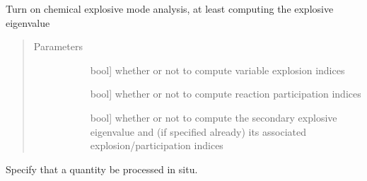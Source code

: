 \documentclass[letterpaper,10pt,english]{sphinxmanual}
\begin{document}
\begin{fulllineitems}
\begin{fulllineitems}
\begin{quote}
\begin{description}
\begin{description}
\end{description}

\end{description}\end{quote}

\end{fulllineitems}


\begin{fulllineitems}
\label{\detokenize{spitfire.chemistry.flamelet:spitfire.chemistry.flamelet.Flamelet.insitu_process_cema}}
Turn on chemical explosive mode analysis, at least computing the explosive eigenvalue
\begin{quote}\begin{description}
\item[{Parameters}] \leavevmode\begin{description}
\item[{}] \leavevmode{[}bool{]}
whether or not to compute variable explosion indices

\item[{}] \leavevmode{[}bool{]}
whether or not to compute reaction participation indices

\item[{}] \leavevmode{[}bool{]}
whether or not to compute the secondary explosive eigenvalue and (if specified already) its associated explosion/participation indices

\end{description}

\end{description}\end{quote}

\end{fulllineitems}


\begin{fulllineitems}
\label{\detokenize{spitfire.chemistry.flamelet:spitfire.chemistry.flamelet.Flamelet.insitu_process_quantity}}
Specify that a quantity be processed in situ.
\begin{quote}


\end{quote}
\end{fulllineitems}
\end{fulllineitems}
\end{document}
